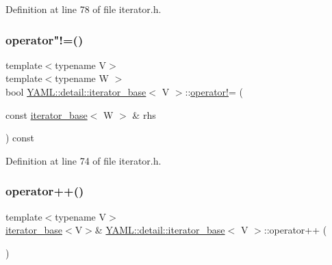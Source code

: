 Definition at line 78 of file iterator.\+h.

\mbox{\label{class_y_a_m_l_1_1detail_1_1iterator__base_a7dfa171b2e7e04197339c95fe4f23a31}} 
\subsubsection{\texorpdfstring{operator"!=()}{operator!=()}}
{\footnotesize\ttfamily template$<$typename V$>$ \\
template$<$typename W $>$ \\
bool \mbox{\hyperlink{class_y_a_m_l_1_1detail_1_1iterator__base}{Y\+A\+M\+L\+::detail\+::iterator\+\_\+base}}$<$ V $>$\+::\mbox{\hyperlink{namespace_y_a_m_l_a1e1f522940ab0016a28e1969ba4846c2}{operator!}}= (\begin{DoxyParamCaption}\item[{const \mbox{\hyperlink{class_y_a_m_l_1_1detail_1_1iterator__base}{iterator\+\_\+base}}$<$ W $>$ \&}]{rhs }\end{DoxyParamCaption}) const\hspace{0.3cm}{\ttfamily [inline]}}



Definition at line 74 of file iterator.\+h.

\mbox{\label{class_y_a_m_l_1_1detail_1_1iterator__base_ae5680c4b153d5024f3003d5b81da5859}} 
\subsubsection{\texorpdfstring{operator++()}{operator++()}\hspace{0.1cm}{\footnotesize\ttfamily [1/2]}}
{\footnotesize\ttfamily template$<$typename V$>$ \\
\mbox{\hyperlink{class_y_a_m_l_1_1detail_1_1iterator__base}{iterator\+\_\+base}}$<$V$>$\& \mbox{\hyperlink{class_y_a_m_l_1_1detail_1_1iterator__base}{Y\+A\+M\+L\+::detail\+::iterator\+\_\+base}}$<$ V $>$\+::operator++ (\begin{DoxyParamCaption}{ }\end{DoxyParamCaption})\hspace{0.3cm}{\ttfamily [inline]}}



